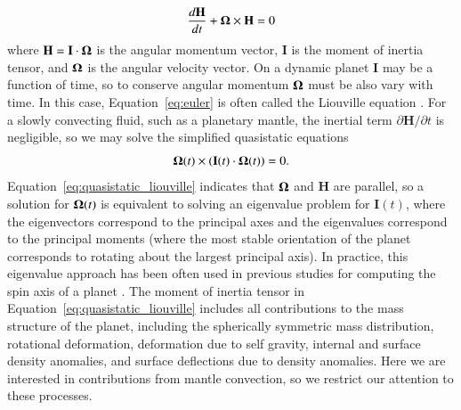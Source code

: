\documentclass[preprint,12pt,authoryear]{elsarticle}
\newcommand{\mitbf}[1]{\hbox{\mathversion{bold}$#1$}}
\begin{document}
\begin{equation}
\frac{d \mathbf{H}}{dt} + \mitbf{\Omega} \times \mathbf{H} = 0
\label{eq:euler}
\end{equation}
where $\mathbf{H} = \mathbf{I} \cdot \mitbf{\Omega}$ is the angular momentum vector, $\mathbf{I}$ is the moment of inertia tensor, and $\mitbf{\Omega}$ is the angular velocity vector.
On a dynamic planet $\mathbf{I}$ may be a function of time, so to conserve angular momentum $\mitbf{\Omega}$ must be also vary with time.
In this case, Equation~\eqref{eq:euler} is often called the Liouville equation \citep[e.g.][]{munk1960rotation}.
For a slowly convecting fluid, such as a planetary mantle, the inertial term $\partial \mathbf{H} / \partial t$ is negligible, so we may solve the simplified quasistatic equations
\begin{equation}
\mitbf{\Omega } (t)\times ( \mathbf{I}(t) \cdot \mitbf{\Omega }(t) ) = 0.
\label{eq:quasistatic_liouville}
\end{equation}
Equation~\eqref{eq:quasistatic_liouville} indicates that $\mitbf{\Omega}$ and $\mathbf{H}$ are parallel, so a solution for $\mitbf{\Omega}(t)$ is equivalent to solving an eigenvalue problem for $\mathbf{I}(t)$, where the eigenvectors correspond to the principal axes and the eigenvalues correspond to the principal moments (where the most stable orientation of the planet corresponds to rotating about the largest principal axis).
In practice, this eigenvalue approach has been often used in previous studies for computing the spin axis of a planet \citep[e.g.][]{steinberger1997changes, roberts2007cause}.
The moment of inertia tensor in Equation~\eqref{eq:quasistatic_liouville} includes all contributions to the mass structure
of the planet, including the spherically symmetric mass distribution, rotational deformation, deformation due to self gravity, internal and surface density anomalies, and surface deflections due to density anomalies.
Here we are interested in contributions from mantle convection, so we restrict our attention to these processes.
\end{document}
